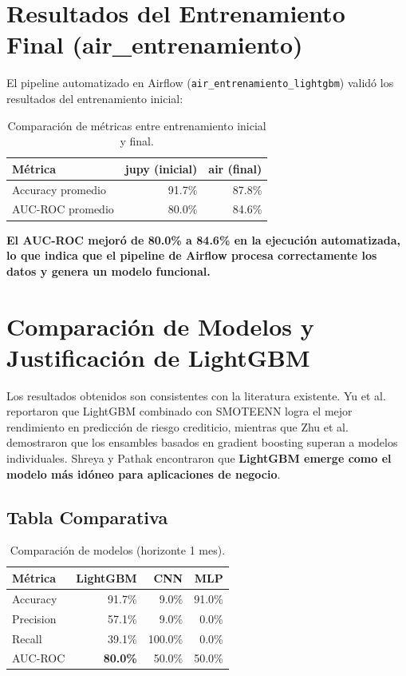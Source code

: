 \section{Resultados del Entrenamiento Final (air\_entrenamiento)}

El pipeline automatizado en Airflow (\texttt{air\_entrenamiento\_lightgbm}) validó los resultados del entrenamiento inicial:

\begin{table}[h!]
\centering
\begin{tabular}{|l|r|r|}
\hline
\textbf{Métrica} & \textbf{jupy (inicial)} & \textbf{air (final)} \\
\hline
Accuracy promedio & 91.7\% & 87.8\% \\
\hline
AUC-ROC promedio & 80.0\% & 84.6\% \\
\hline
\end{tabular}
\caption{Comparación de métricas entre entrenamiento inicial y final.}
\label{tab:comparacion_inicial_final}
\end{table}

\textbf{El AUC-ROC mejoró de 80.0\% a 84.6\% en la ejecución automatizada, lo que indica que el pipeline de Airflow procesa correctamente los datos y genera un modelo funcional.}

\section{Comparación de Modelos y Justificación de LightGBM}
\label{section:comparacion_modelos_justificacion}

Los resultados obtenidos son consistentes con la literatura existente. Yu et al. \cite{yu2024advanced} reportaron que LightGBM combinado con SMOTEENN logra el mejor rendimiento en predicción de riesgo crediticio, mientras que Zhu et al. \cite{zhu2024ensemble} demostraron que los ensambles basados en gradient boosting superan a modelos individuales. Shreya y Pathak \cite{shreya2025explainable} encontraron que \textbf{LightGBM emerge como el modelo más idóneo para aplicaciones de negocio}.

\subsection{Tabla Comparativa}

\begin{table}[h!]
\centering
\begin{tabular}{|l|r|r|r|}
\hline
\textbf{Métrica} & \textbf{LightGBM} & \textbf{CNN} & \textbf{MLP} \\
\hline
Accuracy & 91.7\% & 9.0\% & 91.0\% \\
\hline
Precision & 57.1\% & 9.0\% & 0.0\% \\
\hline
Recall & 39.1\% & 100.0\% & 0.0\% \\
\hline
AUC-ROC & \textbf{80.0\%} & 50.0\% & 50.0\% \\
\hline
\end{tabular}
\caption{Comparación de modelos (horizonte 1 mes).}
\label{tab:comparacion_modelos}
\end{table}

